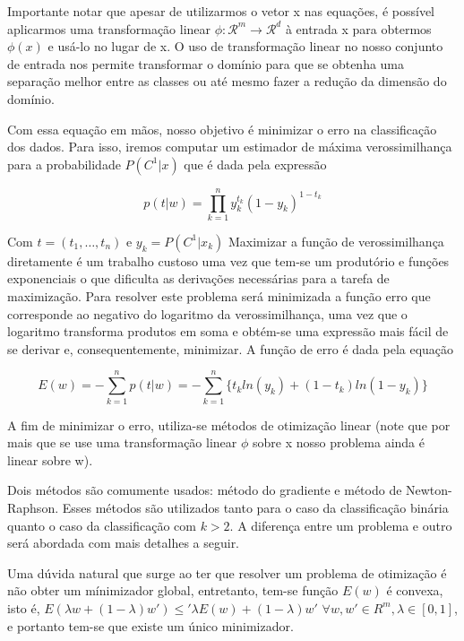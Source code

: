 Importante notar que apesar de utilizarmos o vetor x nas equações, é possível aplicarmos uma
transformação linear $\phi : \mathcal{R}^m \rightarrow \mathcal{R}^d$ à entrada x para obtermos
$\phi(x)$ e usá-lo no lugar de x. O uso de transformação linear no nosso conjunto
de entrada nos permite transformar o domínio para que se obtenha uma separação
melhor entre as classes ou até mesmo fazer a redução da dimensão do domínio.

Com essa equação em mãos, nosso objetivo é minimizar o erro na classificação dos dados.
Para isso, iremos computar um estimador de máxima verossimilhança para a probabilidade
$P(C^1 | x)$ que é dada pela expressão

\begin{center}
	\begin{equation}
		p(t | w) = \prod_{k = 1}^n y_k^{t_k}(1 - y_k)^{1 - t_k}	
	\end{equation}
\end{center}

Com $t = (t_1, \ldots, t_n)$ e $y_k = P(C^1 | x_k)$
Maximizar a função de verossimilhança diretamente é um trabalho custoso uma vez que
tem-se um produtório e funções exponenciais o que dificulta as derivações necessárias
para a tarefa de maximização. Para resolver este problema será minimizada a função
erro que corresponde ao negativo do logaritmo da verossimilhança, uma vez que
o logaritmo transforma produtos em soma e obtém-se uma expressão mais fácil de se
derivar e, consequentemente, minimizar. 
A função de erro é dada pela equação 

\begin{center}
	\begin{equation}
		E(w) = - \sum_{k = 1}^{n} p(t | w) = 
		- \sum_{k = 1}^{n} \{ t_kln(y_k) + (1 - t_k) ln(1 - y_k) \}
	\end{equation}
\end{center}

A fim de minimizar o erro, utiliza-se métodos de otimização linear (note que por mais que se use uma
transformação linear $\phi$ sobre x nosso problema ainda é linear sobre w).

Dois métodos são comumente	usados: método do gradiente e método de Newton-Raphson.
Esses métodos são utilizados tanto para o caso da classificação binária
quanto o caso da classificação com $k > 2$. A diferença entre um problema e outro será abordada
com mais detalhes a seguir.

Uma dúvida natural que surge ao ter que resolver um problema de otimização é não
obter um mínimizador global, entretanto, tem-se
função $E(w)$ é convexa, isto é, $E(\lambda w + (1 - \lambda ) w') \leq' \lambda E(w) 
	+ (1 - \lambda ) w'$
 $\forall w, w' \in R^m, \lambda \in [0, 1]$, e portanto tem-se que existe um único minimizador.


